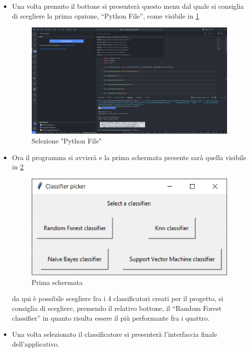 \begin{itemize}
\item Una volta premuto il bottone si presenterà questo menu dal quale si consiglia di scegliere la prima opzione, “Python File”, come visibile in \ref{img:7}
\begin{figure}
    \begin{center}    
        \includegraphics[width=0.72\linewidth]{images/image7.png}
        \caption{Selezione "Python File"}
        \label{img:7}
    \end{center}
\end{figure}
\newpage
\item Ora il programma si avvierà e la prima schermata presente sarà quella visibile in \ref{img:8}
\begin{figure}
    \begin{center}    
        \includegraphics[width=0.72\linewidth]{images/image8.png}
        \caption{Prima schermata}
        \label{img:8}
    \end{center}
\end{figure}

da qui è possibile scegliere fra i 4 classificatori creati per il progetto, si consiglia di scegliere, premendo il relativo bottone, il “Random Forest classifier” in quanto risulta essere il più performante fra i quattro.
\item Una volta selezionato il classificatore si presenterà l’interfaccia finale dell’applicativo.
\end{itemize}

